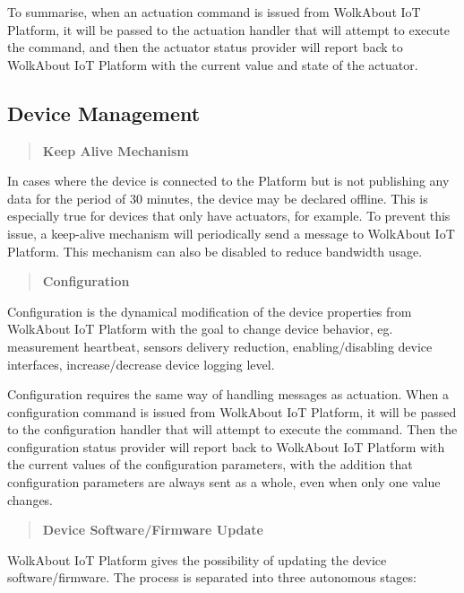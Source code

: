 To summarise, when an actuation command is issued from Wolk\+About IoT Platform, it will be passed to the actuation handler that will attempt to execute the command, and then the actuator status provider will report back to Wolk\+About IoT Platform with the current value and state of the actuator.

\subsection*{Device Management}





\label{_keep-alive-mechanism}%
 \begin{quote}
{\bfseries Keep Alive Mechanism} \end{quote}
In cases where the device is connected to the Platform but is not publishing any data for the period of 30 minutes, the device may be declared offline. This is especially true for devices that only have actuators, for example. To prevent this issue, a keep-\/alive mechanism will periodically send a message to Wolk\+About IoT Platform. This mechanism can also be disabled to reduce bandwidth usage.

\label{_configuration}%
 \begin{quote}
{\bfseries Configuration} \end{quote}
Configuration is the dynamical modification of the device properties from Wolk\+About IoT Platform with the goal to change device behavior, eg. measurement heartbeat, sensors delivery reduction, enabling/disabling device interfaces, increase/decrease device logging level.

Configuration requires the same way of handling messages as actuation. When a configuration command is issued from Wolk\+About IoT Platform, it will be passed to the configuration handler that will attempt to execute the command. Then the configuration status provider will report back to Wolk\+About IoT Platform with the current values of the configuration parameters, with the addition that configuration parameters are always sent as a whole, even when only one value changes.

\label{_dfu}%
 \begin{quote}
{\bfseries Device Software/\+Firmware Update} \end{quote}
Wolk\+About IoT Platform gives the possibility of updating the device software/firmware. The process is separated into three autonomous stages\+:


